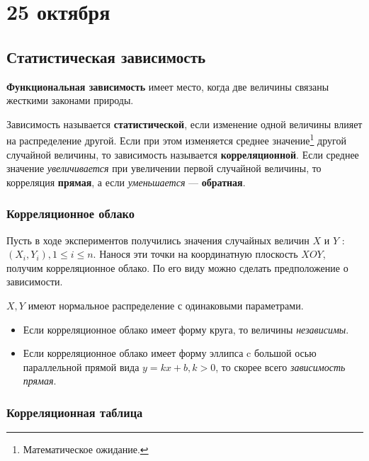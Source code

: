 \chapter{25 октября}

\section{Статистическая зависимость}

\begin{definition}
    \textbf{Функциональная зависимость} имеет место, когда две величины связаны жесткими законами природы.
\end{definition}

\begin{definition}
    Зависимость называется \textbf{статистической}, если изменение одной величины влияет на распределение другой. Если при этом изменяется среднее значение\footnote{Математическое ожидание.} другой случайной величины, то зависимость называется \textbf{корреляционной}. Если среднее значение \textit{увеличивается} при увеличении первой случайной величины, то корреляция \textbf{прямая}, а если \textit{уменьшается} --- \textbf{обратная}.
\end{definition}

\subsection{Корреляционное облако}

Пусть в ходе экспериментов получились значения случайных величин \(X\) и \(Y\) : \((X_i, Y_i), 1 \leq i \leq n\). Нанося эти точки  на координатную плоскость \(XOY\), получим корреляционное облако. По его виду можно сделать предположение о зависимости.

\begin{example}
    \(X, Y\) имеют нормальное распределение с одинаковыми параметрами.
    \begin{itemize}
        \item Если корреляционное облако имеет форму круга, то величины \textit{независимы}.
        \item  Если корреляционное облако имеет форму эллипса c большой осью параллельной прямой вида \(y = kx + b, k > 0\), то скорее всего \textit{зависимость прямая}.
    \end{itemize}
\end{example}

\subsection{Корреляционная таблица}

